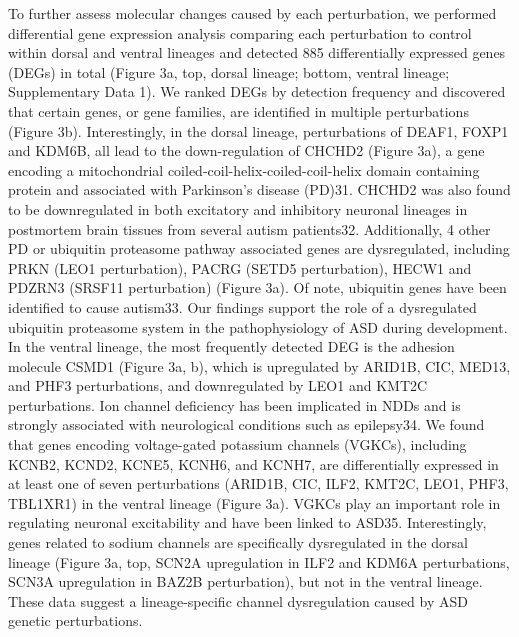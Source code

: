 To further assess molecular changes caused by each perturbation, we performed differential gene expression analysis comparing each perturbation to control within dorsal and ventral lineages and detected 885 differentially expressed genes (DEGs) in total (Figure 3a, top, dorsal lineage; bottom, ventral lineage; Supplementary Data 1). We ranked DEGs by detection frequency and discovered that certain genes, or gene families, are identified in multiple perturbations (Figure 3b). Interestingly, in the dorsal lineage, perturbations of DEAF1, FOXP1 and KDM6B, all lead to the down-regulation of CHCHD2 (Figure 3a), a gene encoding a mitochondrial coiled-coil-helix-coiled-coil-helix domain containing protein and associated with Parkinson's disease (PD)31. CHCHD2 was also found to be downregulated in both excitatory and inhibitory neuronal lineages in postmortem brain tissues from several autism patients32. Additionally, 4 other PD or ubiquitin proteasome pathway associated genes are dysregulated, including PRKN (LEO1 perturbation), PACRG (SETD5 perturbation), HECW1 and PDZRN3 (SRSF11 perturbation) (Figure 3a). Of note, ubiquitin genes have been identified to cause autism33. Our findings support the role of a dysregulated ubiquitin proteasome system in the pathophysiology of ASD during development. In the ventral lineage, the most frequently detected DEG is the adhesion molecule CSMD1 (Figure 3a, b), which is upregulated by ARID1B, CIC, MED13, and PHF3 perturbations, and downregulated by LEO1 and KMT2C perturbations.
Ion channel deficiency has been implicated in NDDs and is strongly associated with neurological conditions such as epilepsy34. We found that genes encoding voltage-gated potassium channels (VGKCs), including KCNB2, KCND2, KCNE5, KCNH6, and KCNH7, are differentially expressed in at least one of seven perturbations (ARID1B, CIC, ILF2, KMT2C, LEO1, PHF3, TBL1XR1) in the ventral lineage (Figure 3a). VGKCs play an important role in regulating neuronal excitability and have been linked to ASD35. Interestingly, genes related to sodium channels are specifically dysregulated in the dorsal lineage (Figure 3a, top, SCN2A upregulation in ILF2 and KDM6A perturbations, SCN3A upregulation in BAZ2B perturbation), but not in the ventral lineage. These data suggest a lineage-specific channel dysregulation caused by ASD genetic perturbations. 


